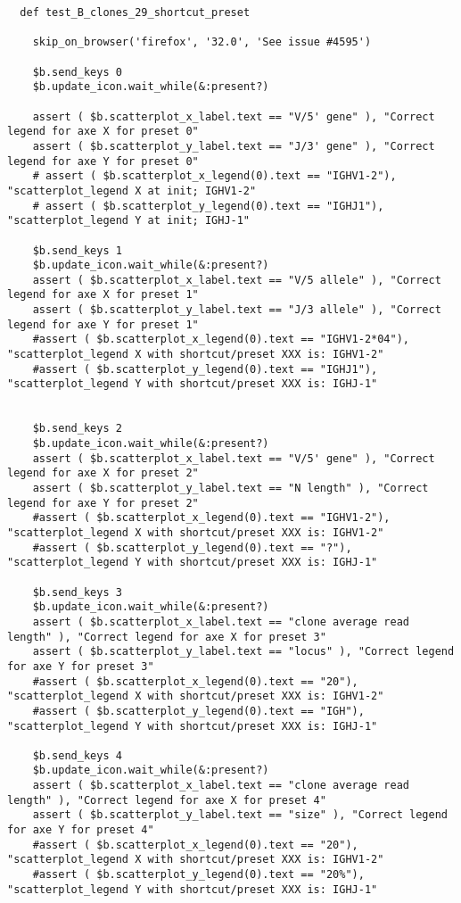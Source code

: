 \begin{verbatim}
  def test_B_clones_29_shortcut_preset

    skip_on_browser('firefox', '32.0', 'See issue #4595')

    $b.send_keys 0
    $b.update_icon.wait_while(&:present?)

    assert ( $b.scatterplot_x_label.text == "V/5' gene" ), "Correct legend for axe X for preset 0"
    assert ( $b.scatterplot_y_label.text == "J/3' gene" ), "Correct legend for axe Y for preset 0"
    # assert ( $b.scatterplot_x_legend(0).text == "IGHV1-2"), "scatterplot_legend X at init; IGHV1-2"
    # assert ( $b.scatterplot_y_legend(0).text == "IGHJ1"), "scatterplot_legend Y at init; IGHJ-1"

    $b.send_keys 1
    $b.update_icon.wait_while(&:present?)
    assert ( $b.scatterplot_x_label.text == "V/5 allele" ), "Correct legend for axe X for preset 1"
    assert ( $b.scatterplot_y_label.text == "J/3 allele" ), "Correct legend for axe Y for preset 1"
    #assert ( $b.scatterplot_x_legend(0).text == "IGHV1-2*04"), "scatterplot_legend X with shortcut/preset XXX is: IGHV1-2"
    #assert ( $b.scatterplot_y_legend(0).text == "IGHJ1"), "scatterplot_legend Y with shortcut/preset XXX is: IGHJ-1"


    $b.send_keys 2
    $b.update_icon.wait_while(&:present?)
    assert ( $b.scatterplot_x_label.text == "V/5' gene" ), "Correct legend for axe X for preset 2"
    assert ( $b.scatterplot_y_label.text == "N length" ), "Correct legend for axe Y for preset 2"
    #assert ( $b.scatterplot_x_legend(0).text == "IGHV1-2"), "scatterplot_legend X with shortcut/preset XXX is: IGHV1-2"
    #assert ( $b.scatterplot_y_legend(0).text == "?"), "scatterplot_legend Y with shortcut/preset XXX is: IGHJ-1"

    $b.send_keys 3
    $b.update_icon.wait_while(&:present?)
    assert ( $b.scatterplot_x_label.text == "clone average read length" ), "Correct legend for axe X for preset 3"
    assert ( $b.scatterplot_y_label.text == "locus" ), "Correct legend for axe Y for preset 3"
    #assert ( $b.scatterplot_x_legend(0).text == "20"), "scatterplot_legend X with shortcut/preset XXX is: IGHV1-2"
    #assert ( $b.scatterplot_y_legend(0).text == "IGH"), "scatterplot_legend Y with shortcut/preset XXX is: IGHJ-1"

    $b.send_keys 4
    $b.update_icon.wait_while(&:present?)
    assert ( $b.scatterplot_x_label.text == "clone average read length" ), "Correct legend for axe X for preset 4"
    assert ( $b.scatterplot_y_label.text == "size" ), "Correct legend for axe Y for preset 4"
    #assert ( $b.scatterplot_x_legend(0).text == "20"), "scatterplot_legend X with shortcut/preset XXX is: IGHV1-2"
    #assert ( $b.scatterplot_y_legend(0).text == "20%"), "scatterplot_legend Y with shortcut/preset XXX is: IGHJ-1"


\end{verbatim}

